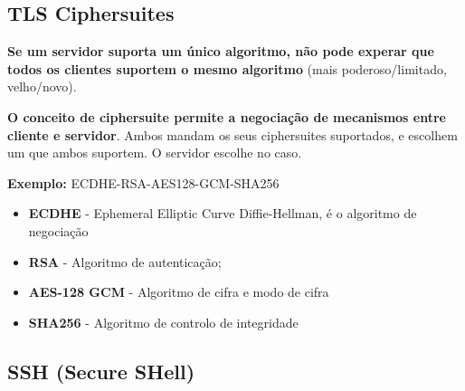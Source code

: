 \documentclass{article}
\begin{document}
\subsection{TLS Ciphersuites}

\begin{flushleft}
  \textbf{Se um servidor suporta um único algoritmo, não pode experar que
  todos os clientes suportem o mesmo algoritmo} (mais poderoso/limitado, velho/novo).

  \vspace{2mm}

  \textbf{O conceito de ciphersuite permite a negociação de mecanismos
  entre cliente e servidor}. Ambos mandam os seus ciphersuites suportados,
  e escolhem um que ambos suportem. O servidor escolhe no caso.

  \vspace{2mm}

  \textbf{Exemplo:} ECDHE-RSA-AES128-GCM-SHA256

  \begin{itemize}
    \item \textbf{ECDHE} - Ephemeral Elliptic Curve Diffie-Hellman, é o algoritmo de negociação
    \item \textbf{RSA} - Algoritmo de autenticação;
    \item \textbf{AES-128 GCM} - Algoritmo de cifra e modo de cifra
    \item \textbf{SHA256} - Algoritmo de controlo de integridade
  \end{itemize}
\end{flushleft}

\subsection{SSH (Secure SHell)}
\end{document}
